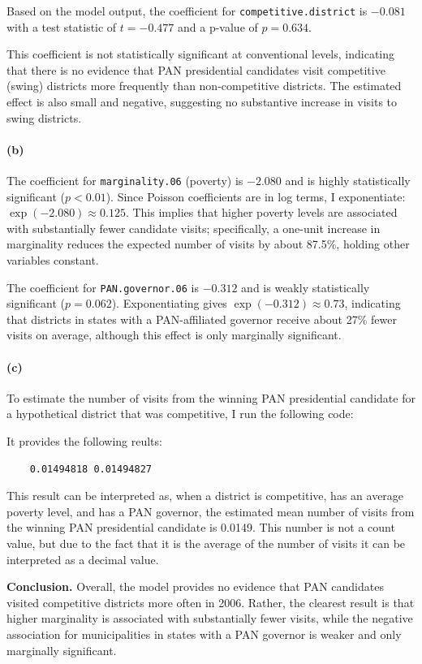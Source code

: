 \documentclass[12pt,letterpaper]{article}
\begin{document}
Based on the model output, the coefficient for \texttt{competitive.district} is $-0.081$ with a test statistic of $t = -0.477$ and a p-value of $p = 0.634$. 

This coefficient is not statistically significant at conventional levels, indicating that there is no evidence that PAN presidential candidates visit competitive (swing) districts more frequently than non-competitive districts. The estimated effect is also small and negative, suggesting no substantive increase in visits to swing districts.

\paragraph{(b)}

The coefficient for \texttt{marginality.06} (poverty) is $-2.080$ and is highly statistically significant ($p < 0.01$). Since Poisson coefficients are in log terms, I exponentiate: $\exp(-2.080) \approx 0.125$. This implies that higher poverty levels are associated with substantially fewer candidate visits; specifically, a one-unit increase in marginality reduces the expected number of visits by about 87.5\%, holding other variables constant.

The coefficient for \texttt{PAN.governor.06} is $-0.312$ and is weakly statistically significant ($p = 0.062$). Exponentiating gives $\exp(-0.312) \approx 0.73$, indicating that districts in states with a PAN-affiliated governor receive about 27\% fewer visits on average, although this effect is only marginally significant.

\paragraph{(c)}
To estimate the number of visits from the winning PAN presidential candidate for a hypothetical district that was competitive, I run the following code:




It provides the following reults:

\begin{verbatim}           
	0.01494818 0.01494827 
\end{verbatim}

\noindent This result can be interpreted as, when a district is competitive, has an average poverty level, and has a PAN governor, the estimated mean number of visits from the winning PAN presidential candidate is 0.0149. This number is not a count value, but due to the fact that it is the average of the number of visits it can be interpreted as a decimal value. 


\noindent \textbf{Conclusion.}
Overall, the  model provides no evidence that PAN candidates visited competitive districts more often in 2006. Rather, the clearest result is that higher marginality is associated with substantially fewer visits, while the negative association for municipalities in states with a PAN governor is weaker and only marginally significant.\\
\end{document}
